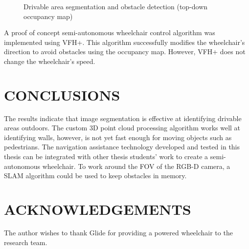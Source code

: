 \documentclass[10pt,twoside]{article}
\begin{document}
\begin{figure}[H]
\begin{subfigure}{.2\textwidth}
    \end{subfigure}
    \caption{Drivable area segmentation and obstacle detection (top-down occupancy map)}
    \label{fig:algorithm}
\end{figure}

A proof of concept semi-autonomous wheelchair control algorithm was implemented using VFH+.
This algorithm successfully modifies the wheelchair's direction to avoid obstacles using the
occupancy map. However, VFH+ does not change the wheelchair's speed.

\section*{\textbf{CONCLUSIONS}} %
The results indicate that image segmentation is effective at identifying drivable areas outdoors.
The custom 3D point cloud processing algorithm works well at identifying walls,
however, is not yet fast enough for moving objects such as pedestrians.
The navigation assistance technology developed and tested in this thesis can be integrated
with other thesis students' work to create a semi-autonomous wheelchair. To work around the FOV
of the RGB-D camera, a SLAM algorithm could be used to keep obstacles in memory.

\section*{\textbf{ACKNOWLEDGEMENTS}}
The author wishes to thank Glide for providing a powered wheelchair to the research team.

\printbibliography[title=\textbf{REFERENCES},heading=bibliography] %
\end{document}
